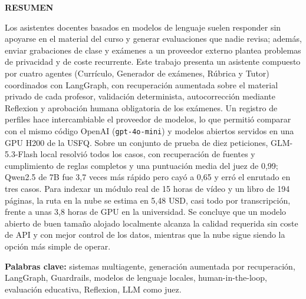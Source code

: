 \documentclass[journal]{IEEEtran}
\begin{document}
\begin{center}
\textbf{\fontsize{14}{16}\selectfont RESUMEN}\\
\vspace{10pt}
\end{center}
\fontsize{12}{14}\selectfont 
{
\setlength{\parindent}{3em}
\hspace{1pt}
Los asistentes docentes basados en modelos de lenguaje suelen responder sin apoyarse en el material del curso y generar evaluaciones que nadie revisa; además, enviar grabaciones de clase y exámenes a un proveedor externo plantea problemas de privacidad y de coste recurrente. Este trabajo presenta un asistente compuesto por cuatro agentes (Currículo, Generador de exámenes, Rúbrica y Tutor) coordinados con LangGraph, con recuperación aumentada sobre el material privado de cada profesor, validación determinista, autocorrección mediante Reflexion y aprobación humana obligatoria de los exámenes. Un registro de perfiles hace intercambiable el proveedor de modelos, lo que permitió comparar con el mismo código OpenAI (\texttt{gpt-4o-mini}) y modelos abiertos servidos en una GPU H200 de la USFQ. Sobre un conjunto de prueba de diez peticiones, GLM-5.3-Flash local resolvió todos los casos, con recuperación de fuentes y cumplimiento de reglas completos y una puntuación media del juez de 0,99; Qwen2.5 de 7B fue 3,7 veces más rápido pero cayó a 0,65 y erró el enrutado en tres casos. Para indexar un módulo real de 15 horas de vídeo y un libro de 194 páginas, la ruta en la nube se estima en 5,48 USD, casi todo por transcripción, frente a unas 3,8 horas de GPU en la universidad. Se concluye que un modelo abierto de buen tamaño alojado localmente alcanza la calidad requerida sin coste de API y con mejor control de los datos, mientras que la nube sigue siendo la opción más simple de operar.\\
}
\vspace{10pt}
\begin{center}  
\textbf{\fontsize{12}{14}\selectfont Palabras clave:} sistemas multiagente, generación aumentada por recuperación, LangGraph, Guardrails, modelos de lenguaje locales, human-in-the-loop, evaluación educativa, Reflexion, LLM como juez.
\end{center}

\newpage
\end{document}
